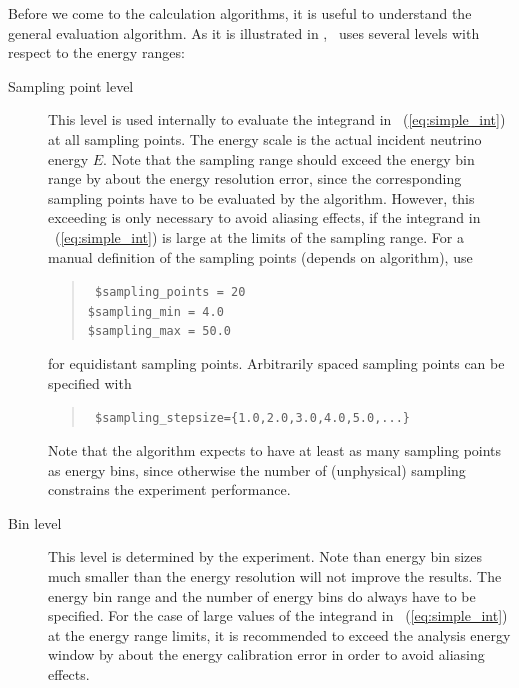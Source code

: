 Before we come to the calculation algorithms, it is useful to understand
the general evaluation algorithm. As it is illustrated in , 
\GLOBES\ uses several levels with respect to the energy ranges:
\begin{description}
\item[Sampling point level]
 This level is used internally to evaluate the integrand in \eq~(\ref{eq:simple_int}) at all sampling points. The energy scale is the actual incident neutrino energy $E$. Note that the sampling range should exceed the energy bin range by about the energy resolution error, since the corresponding sampling points have to be evaluated by the algorithm. 
However, this exceeding is only
necessary to avoid aliasing effects, if the integrand in \eq~(\ref{eq:simple_int}) is large at the limits of the sampling range.
For a manual definition of the sampling points (depends on algorithm), use
\begin{quote}
{\tt
\$sampling\_points = 20\\
\$sampling\_min =          4.0\\
\$sampling\_max =         50.0
}
\end{quote}
for equidistant sampling points. Arbitrarily spaced sampling points can 
be specified with 
\begin{quote}
{\tt
\$sampling\_stepsize=\{1.0,2.0,3.0,4.0,5.0,...\}
}
\end{quote}


 
Note that the algorithm expects to 
have at least as many sampling points as energy bins, since otherwise 
the number of (unphysical) sampling constrains the experiment performance.
\item[Bin level] This level is determined by the experiment. Note than energy
bin sizes much smaller than the energy resolution will not improve the results. The energy bin range and the number of energy bins do always have to be specified. For the case of large values of the integrand in \eq~(\ref{eq:simple_int}) at the energy range limits, it is recommended to exceed the analysis energy window by about the energy calibration error in order to avoid aliasing effects.


\end{description}
